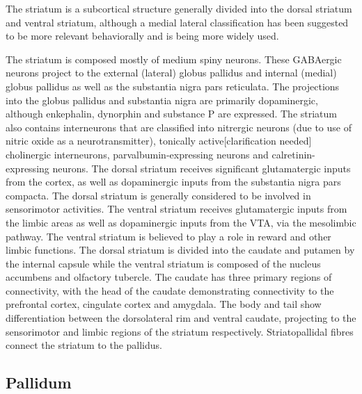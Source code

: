 The striatum is a subcortical structure generally divided into the dorsal striatum and ventral striatum, although a medial lateral classification has been suggested to be more relevant behaviorally and is being more widely used.

The striatum is composed mostly of medium spiny neurons. These GABAergic neurons project to the external (lateral) globus pallidus and internal (medial) globus pallidus as well as the substantia nigra pars reticulata. The projections into the globus pallidus and substantia nigra are primarily dopaminergic, although enkephalin, dynorphin and substance P are expressed. The striatum also contains interneurons that are classified into nitrergic neurons (due to use of nitric oxide as a neurotransmitter), tonically active{[}clarification needed{]} cholinergic interneurons, parvalbumin-expressing neurons and calretinin-expressing neurons. The dorsal striatum receives significant glutamatergic inputs from the cortex, as well as dopaminergic inputs from the substantia nigra pars compacta. The dorsal striatum is generally considered to be involved in sensorimotor activities. The ventral striatum receives glutamatergic inputs from the limbic areas as well as dopaminergic inputs from the VTA, via the mesolimbic pathway. The ventral striatum is believed to play a role in reward and other limbic functions. The dorsal striatum is divided into the caudate and putamen by the internal capsule while the ventral striatum is composed of the nucleus accumbens and olfactory tubercle. The caudate has three primary regions of connectivity, with the head of the caudate demonstrating connectivity to the prefrontal cortex, cingulate cortex and amygdala. The body and tail show differentiation between the dorsolateral rim and ventral caudate, projecting to the sensorimotor and limbic regions of the striatum respectively. Striatopallidal fibres connect the striatum to the pallidus.

\hypertarget{pallidum}{%
\subsection{Pallidum}\label{pallidum}}


